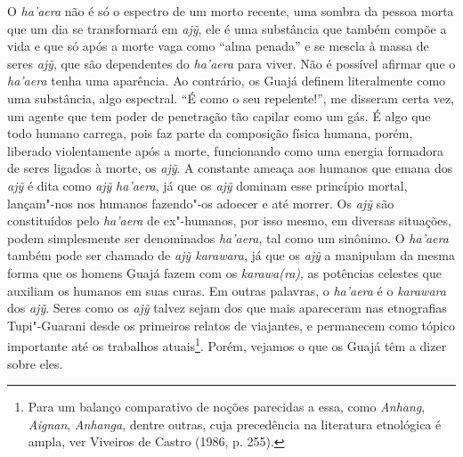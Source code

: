 O \emph{ha'aera} não é só o espectro de um morto recente, uma sombra da
pessoa morta que um dia se transformará em \emph{ajỹ}, ele é uma
substância que também compõe a vida e que só após a morte vaga como
``alma penada'' e se mescla à massa de seres \emph{ajỹ}, que são
dependentes do \emph{ha'aera} para viver. Não é possível afirmar que o
\emph{ha'aera} tenha uma aparência. Ao contrário, os Guajá definem
literalmente como uma substância, algo espectral. ``É como o seu
repelente!'', me disseram certa vez, um agente que tem poder de
penetração tão capilar como um gás. É algo que todo humano carrega, pois
faz parte da composição física humana, porém, liberado violentamente
após a morte, funcionando como uma energia formadora de seres ligados à
morte, os \emph{ajỹ}. A constante ameaça aos humanos que emana dos
\emph{ajỹ} é dita como \emph{ajỹ} \emph{ha'aera}, já que os \emph{ajỹ}
dominam esse princípio mortal, lançam"-nos nos humanos fazendo"-os adoecer
e até morrer. Os \emph{ajỹ} são constituídos pelo \emph{ha'aera} de
ex"-humanos, por isso mesmo, em diversas situações, podem simplesmente
ser denominados \emph{ha'aera}, tal como um sinônimo. O \emph{ha'aera}
também pode ser chamado de \emph{ajỹ karawara}, já que os \emph{ajỹ} a
manipulam da mesma forma que os homens Guajá fazem com os
\emph{karawa(ra)}, as potências celestes que auxiliam os humanos em suas
curas. Em outras palavras, o \emph{ha'aera} é o \emph{karawara} dos
\emph{ajỹ}. Seres como os \emph{ajỹ} talvez sejam dos que mais
apareceram nas etnografias Tupi"-Guarani desde os primeiros relatos de
viajantes, e permanecem como tópico importante até os trabalhos
atuais\footnote{Para um balanço comparativo de noções parecidas a essa,
  como \emph{Anhang}, \emph{Aignan}, \emph{Anhanga}, dentre outras, cuja
  precedência na literatura etnológica é ampla, ver Viveiros de Castro
  (1986, p. 255).}. Porém, vejamos o que os Guajá têm a dizer sobre
eles.


